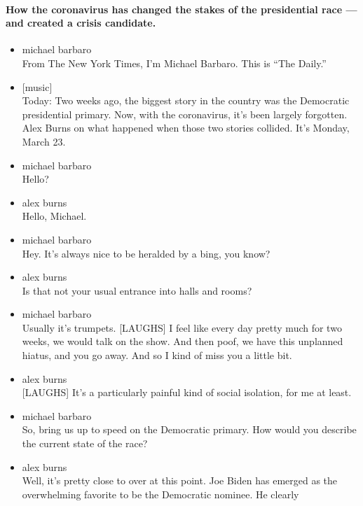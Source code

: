 \hypertarget{how-the-coronavirus-has-changed-the-stakes-of-the-presidential-race--and-created-a-crisis-candidate}{%
\paragraph{How the coronavirus has changed the stakes of the
presidential race --- and created a crisis
candidate.}\label{how-the-coronavirus-has-changed-the-stakes-of-the-presidential-race--and-created-a-crisis-candidate}}

\begin{itemize}
\item
  michael barbaro\\
  From The New York Times, I'm Michael Barbaro. This is ``The Daily.''
\item
  {[}music{]}\\
  Today: Two weeks ago, the biggest story in the country was the
  Democratic presidential primary. Now, with the coronavirus, it's been
  largely forgotten. Alex Burns on what happened when those two stories
  collided. It's Monday, March 23.
\item
  michael barbaro\\
  Hello?
\item
  alex burns\\
  Hello, Michael.
\item
  michael barbaro\\
  Hey. It's always nice to be heralded by a bing, you know?
\item
  alex burns\\
  Is that not your usual entrance into halls and rooms?
\item
  michael barbaro\\
  Usually it's trumpets. {[}LAUGHS{]} I feel like every day pretty much
  for two weeks, we would talk on the show. And then poof, we have this
  unplanned hiatus, and you go away. And so I kind of miss you a little
  bit.
\item
  alex burns\\
  {[}LAUGHS{]} It's a particularly painful kind of social isolation, for
  me at least.
\item
  michael barbaro\\
  So, bring us up to speed on the Democratic primary. How would you
  describe the current state of the race?
\item
  alex burns\\
  Well, it's pretty close to over at this point. Joe Biden has emerged
  as the overwhelming favorite to be the Democratic nominee. He clearly

\end{itemize}
